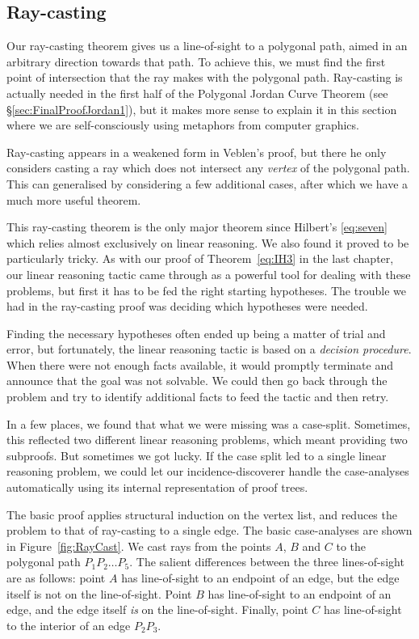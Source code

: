\subsection{Ray-casting}\label{sec:RayCasting}
Our ray-casting theorem gives us a line-of-sight to a polygonal path, aimed in an arbitrary direction towards that path. To achieve this, we must find the first point of intersection that the ray makes with the polygonal path. Ray-casting is actually needed in the first half of the Polygonal Jordan Curve Theorem (see \S\ref{sec:FinalProofJordan1}), but it makes more sense to explain it in this section where we are  self-consciously using metaphors from computer graphics.

Ray-casting appears in a weakened form in Veblen's proof, but there he only considers casting a ray which does not intersect any \emph{vertex} of the polygonal path. This can generalised by considering a few additional cases, after which we have a much more useful theorem.

This ray-casting theorem is the only major theorem since Hilbert's \ref{eq:seven} which relies almost exclusively on linear reasoning. We also found it proved to be particularly tricky. As with our proof of Theorem~\ref{eq:IH3} in the last chapter, our linear reasoning tactic came through as a powerful tool for dealing with these problems, but first it has to be fed the right starting hypotheses. The trouble we had in the ray-casting proof was deciding which hypotheses were needed. 

Finding the necessary hypotheses often ended up being a matter of trial and error, but fortunately, the linear reasoning tactic is based on a \emph{decision procedure}. When there were not enough facts available, it would promptly terminate and announce that the goal was not solvable. We could then go back through the problem and try to identify additional facts to feed the tactic and then retry. 

In a few places, we found that what we were missing was a case-split. Sometimes, this reflected two different linear reasoning problems, which meant providing two subproofs. But sometimes we got lucky. If the case split led to a single linear reasoning problem, we could let our incidence-discoverer handle the case-analyses automatically using its internal representation of proof trees.

The basic proof applies structural induction on the vertex list, and reduces the problem to that of ray-casting to a single edge. The basic case-analyses are shown in Figure~\ref{fig:RayCast}. We cast rays from the points $A$, $B$ and $C$ to the polygonal path $P_1P_2\ldots P_5$. The salient differences between the three lines-of-sight are as follows: point $A$ has line-of-sight to an endpoint of an edge, but the edge itself is not on the line-of-sight. Point $B$ has line-of-sight to an endpoint of an edge, and the edge itself \emph{is} on the line-of-sight. Finally, point $C$ has line-of-sight to the interior of an edge $P_2P_3$. 

